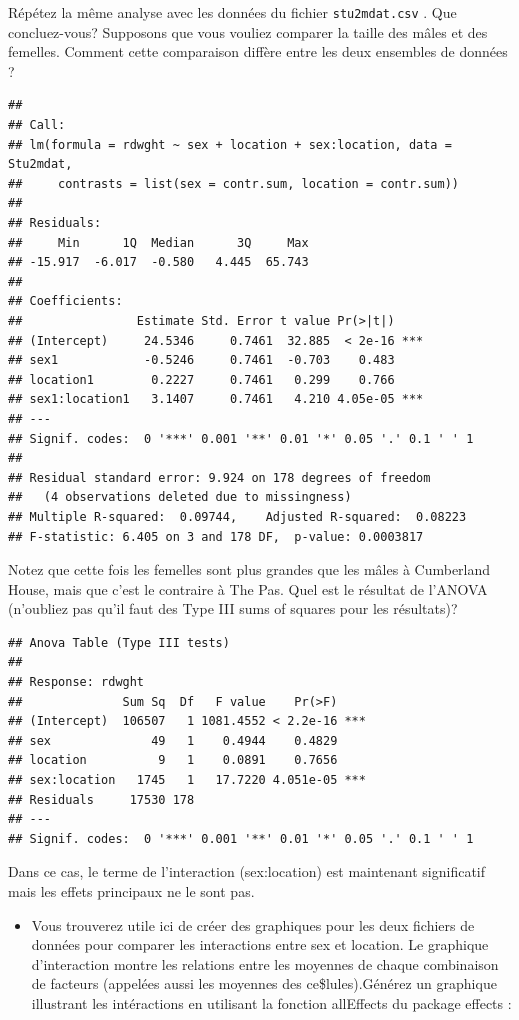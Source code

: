 \documentclass[
  12pt,
]{book}
\makeatletter
\providecommand{\tightlist}{%
  \setlength{\itemsep}{0pt}\setlength{\parskip}{0pt}}
\newenvironment{kframe}{%
\medskip{}
\setlength{\fboxsep}{.8em}
\def\at@end@of@kframe{}%
\ifinner\ifhmode%
 \def\at@end@of@kframe{\end{minipage}}%
 \begin{minipage}{\columnwidth}%
\fi\fi%
\def\FrameCommand##1{\hskip\@totalleftmargin \hskip-\fboxsep
\colorbox{incolor}{##1}\hskip-\fboxsep
    \hskip-\linewidth \hskip-\@totalleftmargin \hskip\columnwidth}%
\MakeFramed {\advance\hsize-\width
  \@totalleftmargin\z@ \linewidth\hsize
  \@setminipage}}%
{\par\unskip\endMakeFramed%
\at@end@of@kframe}
\newenvironment{rmdblock}[1]
 {
 \begin{itemize}
 \renewcommand{\labelitemi}{
   \raisebox{-.7\height}[0pt][0pt]{
     {\setkeys{Gin}{width=3em,keepaspectratio}\texttt{[image: images/\#1]}}
   }
 }
 \begin{kframe}
 \setlength{\fboxsep}{1em}
 \item
 }
 {
 \end{kframe}
 \end{itemize}
 }
\newenvironment{rmdcode}
  {\begin{rmdblock}{screen}}
  {\end{rmdblock}}
\makeatother
\begin{document}
\begin{rmdcode}
Répétez la même analyse avec les données du fichier \texttt{stu2mdat.csv} . Que concluez-vous? Supposons que vous vouliez comparer la taille des mâles et des femelles. Comment cette comparaison diffère entre les deux ensembles de données ?
\end{rmdcode}

\begin{verbatim}
## 
## Call:
## lm(formula = rdwght ~ sex + location + sex:location, data = Stu2mdat, 
##     contrasts = list(sex = contr.sum, location = contr.sum))
## 
## Residuals:
##     Min      1Q  Median      3Q     Max 
## -15.917  -6.017  -0.580   4.445  65.743 
## 
## Coefficients:
##                Estimate Std. Error t value Pr(>|t|)    
## (Intercept)     24.5346     0.7461  32.885  < 2e-16 ***
## sex1            -0.5246     0.7461  -0.703    0.483    
## location1        0.2227     0.7461   0.299    0.766    
## sex1:location1   3.1407     0.7461   4.210 4.05e-05 ***
## ---
## Signif. codes:  0 '***' 0.001 '**' 0.01 '*' 0.05 '.' 0.1 ' ' 1
## 
## Residual standard error: 9.924 on 178 degrees of freedom
##   (4 observations deleted due to missingness)
## Multiple R-squared:  0.09744,    Adjusted R-squared:  0.08223 
## F-statistic: 6.405 on 3 and 178 DF,  p-value: 0.0003817
\end{verbatim}

Notez que cette fois les femelles sont plus grandes que les mâles à Cumberland House, mais que c'est le contraire à The Pas. Quel est le résultat de l'ANOVA (n'oubliez pas qu'il faut des Type III sums of squares pour les résultats)?

\begin{verbatim}
## Anova Table (Type III tests)
## 
## Response: rdwght
##              Sum Sq  Df   F value    Pr(>F)    
## (Intercept)  106507   1 1081.4552 < 2.2e-16 ***
## sex              49   1    0.4944    0.4829    
## location          9   1    0.0891    0.7656    
## sex:location   1745   1   17.7220 4.051e-05 ***
## Residuals     17530 178                        
## ---
## Signif. codes:  0 '***' 0.001 '**' 0.01 '*' 0.05 '.' 0.1 ' ' 1
\end{verbatim}

Dans ce cas, le terme de l'interaction (sex:location) est maintenant significatif mais les effets principaux ne le sont pas.

\begin{itemize}
\tightlist
\item
  Vous trouverez utile ici de créer des graphiques pour les deux fichiers de données pour comparer les interactions entre sex et location. Le graphique d'interaction montre les relations entre les moyennes de chaque combinaison de facteurs (appelées aussi les moyennes des ce\$lules).Générez un graphique illustrant les intéractions en utilisant la fonction allEffects du package effects :
\end{itemize}
\end{document}

